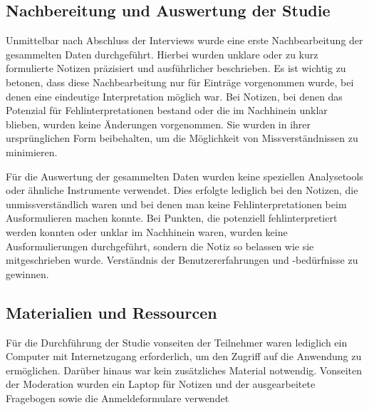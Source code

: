 \subsection{Nachbereitung und Auswertung der Studie}

Unmittelbar nach Abschluss der Interviews wurde eine erste Nachbearbeitung der gesammelten Daten durchgeführt. Hierbei wurden unklare oder zu kurz formulierte Notizen präzisiert und ausführlicher beschrieben. Es ist wichtig zu betonen, dass diese Nachbearbeitung nur für Einträge vorgenommen wurde, bei denen eine eindeutige Interpretation möglich war. Bei Notizen, bei denen das Potenzial für Fehlinterpretationen bestand oder die im Nachhinein unklar blieben, wurden keine Änderungen vorgenommen. Sie wurden in ihrer ursprünglichen Form beibehalten, um die Möglichkeit von Missverständnissen zu minimieren.

Für die Auswertung der gesammelten Daten wurden keine speziellen Analysetools oder ähnliche Instrumente verwendet. Dies erfolgte lediglich bei den Notizen, die unmissverständlich waren und bei denen man keine Fehlinterpretationen beim Ausformulieren machen konnte. Bei Punkten, die potenziell fehlinterpretiert werden konnten oder unklar im Nachhinein waren, wurden keine Ausformulierungen durchgeführt, sondern die Notiz so belassen wie sie mitgeschrieben wurde. Verständnis der Benutzererfahrungen und -bedürfnisse zu gewinnen.



\subsection{Materialien und Ressourcen}

Für die Durchführung der Studie vonseiten der Teilnehmer waren lediglich ein Computer mit Internetzugang erforderlich, um den Zugriff auf die Anwendung zu ermöglichen. Darüber hinaus war kein zusätzliches Material notwendig.
Vonseiten der Moderation wurden ein Laptop für Notizen und der ausgearbeitete Fragebogen sowie die Anmeldeformulare verwendet

 
 

